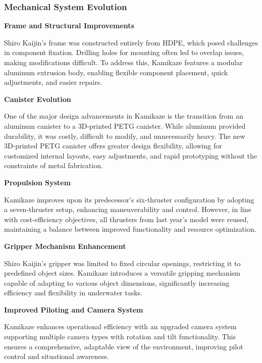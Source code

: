 \subsubsection{Mechanical System Evolution}

\textbf{Frame and Structural Improvements}

Shiro Kaijin’s frame was constructed entirely from HDPE, which posed challenges in component fixation. Drilling holes for mounting often led to overlap issues, making modifications difficult. To address this, Kamikaze features a modular aluminum extrusion body, enabling flexible component placement, quick adjustments, and easier repairs.

\vspace{0.2cm}
\textbf{Canister Evolution}

One of the major design advancements in Kamikaze is the transition from an aluminum canister to a 3D-printed PETG canister. While aluminum provided durability, it was costly, difficult to modify, and unnecessarily heavy. The new 3D-printed PETG canister offers greater design flexibility, allowing for customized internal layouts, easy adjustments, and rapid prototyping without the constraints of metal fabrication.

\vspace{0.2cm}
\textbf{Propulsion System}

Kamikaze improves upon its predecessor’s six-thruster configuration by adopting a seven-thruster setup, enhancing maneuverability and control. However, in line with cost-efficiency objectives, all thrusters from last year’s model were reused, maintaining a balance between improved functionality and resource optimization.

\vspace{0.2cm}
\textbf{Gripper Mechanism Enhancement}

Shiro Kaijin’s gripper was limited to fixed circular openings, restricting it to predefined object sizes. Kamikaze introduces a versatile gripping mechanism capable of adapting to various object dimensions, significantly increasing efficiency and flexibility in underwater tasks.

\vspace{0.2cm}
\textbf{Improved Piloting and Camera System}

Kamikaze enhances operational efficiency with an upgraded camera system supporting multiple camera types with rotation and tilt functionality. This ensures a comprehensive, adaptable view of the environment, improving pilot control and situational awareness.

